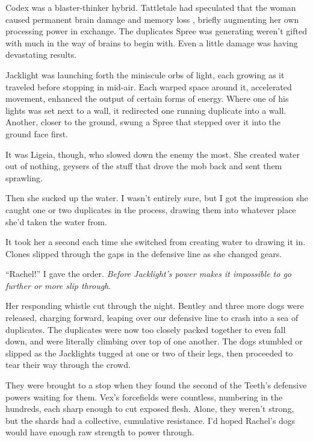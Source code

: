 Codex was a blaster-thinker hybrid.  Tattletale had speculated that the woman caused permanent brain damage and memory loss , briefly augmenting her own processing power in exchange.  The duplicates Spree was generating weren't gifted with much in the way of brains to begin with.  Even a little damage was having devastating results.



Jacklight was launching forth the miniscule orbs of light, each growing as it traveled before stopping in mid-air.  Each warped space around it, accelerated movement, enhanced the output of certain forms of energy.  Where one of his lights was set next to a wall, it redirected one running duplicate into a wall.  Another, closer to the ground, swung a Spree that stepped over it into the ground face first.



It was Ligeia, though, who slowed down the enemy the most.  She created water out of nothing, geysers of the stuff that drove the mob back and sent them sprawling.



Then she sucked up the water.  I wasn't entirely sure, but I got the impression she caught one or two duplicates in the process, drawing them into whatever place she'd taken the water from.



It took her a second each time she switched from creating water to drawing it in.  Clones slipped through the gaps in the defensive line as she changed gears.



``Rachel!'' I gave the order.  \emph{Before Jacklight's power makes it impossible to go further or more slip through}.



Her responding whistle cut through the night.  Bentley and three more dogs were released, charging forward, leaping over our defensive line to crash into a sea of duplicates.  The duplicates were now too closely packed together to even fall down, and were literally climbing over top of one another.  The dogs stumbled or slipped as the Jacklights tugged at one or two of their legs, then proceeded to tear their way through the crowd.



They were brought to a stop when they found the second of the Teeth's defensive powers waiting for them.  Vex's forcefields were countless, numbering in the hundreds, each sharp enough to cut exposed flesh.  Alone, they weren't strong, but the shards had a collective, cumulative resistance.  I'd hoped Rachel's dogs would have enough raw strength to power through.



